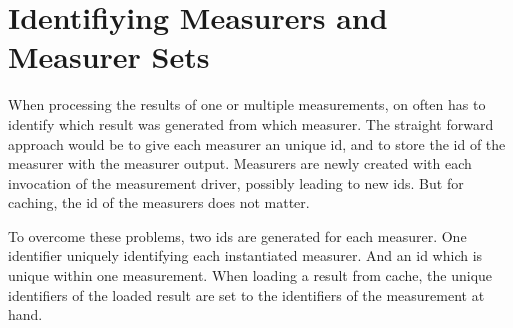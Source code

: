 \documentclass[a4paper,12pt]{article}
\begin{document}
\section{Identifiying Measurers and Measurer Sets}
When processing the results of one or multiple measurements, on often has to identify which result was generated from which measurer. The straight forward approach would be to give each measurer an unique id, and to store the id of the measurer with the measurer output. Measurers are newly created with each invocation of the measurement driver, possibly leading to new ids. But for caching, the id of the measurers does not matter.

To overcome these problems, two ids are generated for each measurer. One identifier uniquely identifying each instantiated measurer. And an id which is unique within one measurement. When loading a result from cache, the unique identifiers of the loaded result are set to the identifiers of the measurement at hand.

\listoffigures




\end{document}
